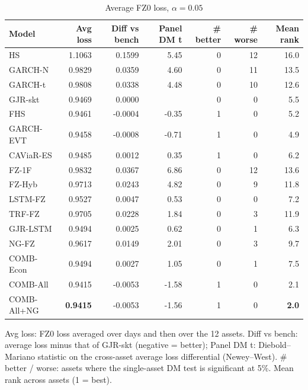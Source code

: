 \begin{table}[htbp]
\centering
\footnotesize
\caption{Average FZ0 loss, $\alpha=0.05$}
\label{tab:loss_a050}
\begin{tabular}{lrrrrrr}
\toprule
Model & Avg loss & Diff vs bench & Panel DM t & \# better & \# worse & Mean rank \\
\midrule
HS & 1.1063 & 0.1599 & 5.45 & 0 & 12 & 16.0 \\
GARCH-N & 0.9829 & 0.0359 & 4.60 & 0 & 11 & 13.5 \\
GARCH-t & 0.9808 & 0.0338 & 4.48 & 0 & 10 & 12.6 \\
GJR-skt & 0.9469 & 0.0000 &  & 0 & 0 & 5.5 \\
FHS & 0.9461 & -0.0004 & -0.35 & 1 & 0 & 5.2 \\
GARCH-EVT & 0.9458 & -0.0008 & -0.71 & 1 & 0 & 4.9 \\
CAViaR-ES & 0.9485 & 0.0012 & 0.35 & 1 & 0 & 6.2 \\
FZ-1F & 0.9832 & 0.0367 & 6.86 & 0 & 12 & 13.6 \\
FZ-Hyb & 0.9713 & 0.0243 & 4.82 & 0 & 9 & 11.8 \\
LSTM-FZ & 0.9527 & 0.0047 & 0.53 & 0 & 0 & 7.2 \\
TRF-FZ & 0.9705 & 0.0228 & 1.84 & 0 & 3 & 11.9 \\
GJR-LSTM & 0.9494 & 0.0025 & 0.62 & 0 & 1 & 6.3 \\
NG-FZ & 0.9617 & 0.0149 & 2.01 & 0 & 3 & 9.7 \\
COMB-Econ & 0.9494 & 0.0027 & 1.05 & 0 & 1 & 7.5 \\
COMB-All & 0.9415 & -0.0053 & -1.58 & 1 & 0 & 2.1 \\
COMB-All+NG & \textbf{0.9415} & -0.0053 & -1.56 & 1 & 0 & \textbf{2.0} \\
\bottomrule
\end{tabular}
\par\smallskip\parbox{\linewidth}{\scriptsize Avg loss: FZ0 loss averaged over days and then over the 12 assets. Diff vs bench: average loss minus that of GJR-skt (negative = better); Panel DM t: Diebold--Mariano statistic on the cross-asset average loss differential (Newey--West). \# better / worse: assets where the single-asset DM test is significant at 5\%. Mean rank across assets (1 = best).}
\end{table}